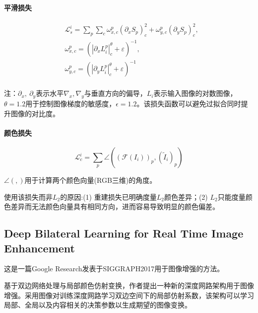 \documentclass[letterpaper,12pt]{article}
\begin{document}
			\paragraph{平滑损失} \qquad
			
			\begin{equation}\label{eq:Smooth loss} %
				\begin{aligned}
					&\mathcal{L}_s^i=\sum_{p}\sum_{c}ω_{x,c}^p(\partial_{x}S_{p})_{c}^{2}+ω_{y,c}^p(\partial_{y}S_{p})_{c}^2, \\
					&\omega_{x,c}^p={(\left|\partial_xL_i^p\right|_c^\theta+\varepsilon)}^{-1}, \\
					&\omega_{y,c}^p={(\left|\partial_yL_i^p\right|_c^\theta+\varepsilon)}^{-1} \\
				\end{aligned}				
			\end{equation}	
			
			注：$\partial_x, \ \partial_y$表示水平$\nabla_x, \nabla_y$与垂直方向的偏导，$L_i$表示输入图像的对数图像，$\theta=1.2$用于控制图像梯度的敏感度，$\epsilon=1.2$。该损失函数可以避免过拟合同时提升图像的对比度。
			
			\paragraph{颜色损失} \qquad
			
			\begin{equation}\label{eq:color loss} %
				\mathcal{L}_{c}^{i}=\sum_p\angle \left((\mathcal{F}(I_i))_p,({\tilde{I}}_i)_p \right)
			\end{equation}	
			
			
			$\angle(,)$用于计算两个颜色向量(RGB三维)的角度。
			
			使用该损失而非$L_2$的原因:(1) 重建损失已明确度量$L_2$颜色差异；(2) $L_2$只能度量颜色差异而无法颜色向量具有相同方向，进而容易导致明显的颜色偏差。
			
			
	
	\subsection{Deep Bilateral Learning for Real Time Image Enhancement}
	
	这是一篇Google Research发表于SIGGRAPH2017用于图像增强的方法。
	
	基于双边网络处理与局部颜色仿射变换，作者提出一种新的深度网路架构用于图像增强。采用图像对训练深度网路学习双边空间下的局部仿射系数，该架构可以学习局部、全局以及内容相关的决策参数以生成期望的图像变换。
	
\end{document}
